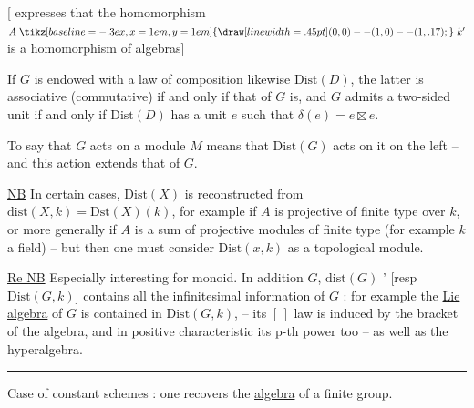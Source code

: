 [ expresses that the homomorphism $A\mathrel{\tikz[baseline=-.3ex,x=1em,y=1em]{\draw[line width=.45pt] (0,0)--(1,0)--(1,.17);}}k'$ is a homomorphism of algebras]

If $G$ is endowed with a law of composition likewise $\mathrm{Dist}(D)$, the latter is associative (commutative) if and only if that of $G$ is, and  $G$ admits a two-sided unit if and only if $\mathrm{Dist}(D)$ has a unit  $e$ such that $\delta(e)=e\boxtimes e$.

To say that $G$ acts on a module $M$  means that $\mathrm{Dist}(G)$ acts on it on the left -- and this action extends that of $G$.

\uline{NB} In certain cases, $\mathrm{Dist}(X)$ is reconstructed from $\mathrm{dist}(X,k)=\mathrm{Dst}(X)(k)$, for example if $A$ is  projective of finite type over $k$, or more generally if $A$ is a sum of projective modules of finite type (for example  $k$ a field) -- but then one must consider $\mathrm{Dist}(x,k)$ as a topological module.

\uline{Re NB} Especially interesting for monoid. In addition   $G$, $\mathrm{dist}(G)$ ' [resp $\mathrm{Dist}(G,k)$] contains all the infinitesimal information of $G$ : for example the \uline{Lie algebra} of $G$ is contained in $\mathrm{Dist}(G,k)$, --  its $[\,]$ law is induced by the bracket of the algebra, and in positive characteristic its p-th power too -- as well as the hyperalgebra.

\begin{center}\rule{1.6cm}{0.55pt}\end{center}
Case of constant schemes : one recovers the \uline{algebra} of a finite group.

